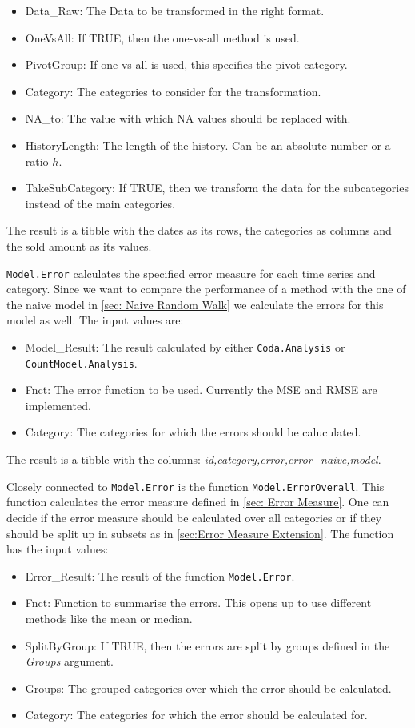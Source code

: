 \begin{itemize}
	\item Data\_Raw: The Data to be transformed in the right format.
  \item OneVsAll: If TRUE, then the one-vs-all method is used.
  \item PivotGroup: If one-vs-all is used, this specifies the pivot category.
  \item Category: The categories to consider for the transformation.
  \item NA\_to: The value with which NA values should be replaced with.
  \item HistoryLength: The length of the history. Can be an absolute number or a ratio $h$. 
  \item TakeSubCategory: If TRUE, then we transform the data for the subcategories instead of the main categories. 
\end{itemize}

The result is a tibble with the dates as its rows, the categories as columns and the sold amount as its values.

\texttt{Model.Error} calculates the specified error measure for each time series and category. Since we want to compare the performance of a method with the one of the naive model in \ref{sec: Naive Random Walk} we calculate the errors for this model as well. The input values are:

\begin{itemize}
	\item Model\_Result: The result calculated by either \texttt{Coda.Analysis} or \texttt{CountModel.Analysis}.
	\item Fnct: The error function to be used. Currently the MSE and RMSE are implemented. 
	\item Category: The categories for which the errors should be caluculated.
\end{itemize}

The result is a tibble with the columns: \textit{id,category,error,error\_naive,model}. 

Closely connected to \texttt{Model.Error} is the function \texttt{Model.ErrorOverall}. This function calculates the error measure defined in \ref{sec: Error Measure}. One can decide if the error measure should be calculated over all categories or if they should be split up in subsets as in \ref{sec:Error Measure Extension}. The function has the input values:

\begin{itemize}
	\item Error\_Result: The result of the function \texttt{Model.Error}.
	\item Fnct: Function to summarise the errors. This opens up to use different methods like the mean or median. 
	\item SplitByGroup: If TRUE, then the errors are split by groups defined in the \textit{Groups} argument. 
	\item Groups: The grouped categories over which the error should be calculated. 
	\item Category: The categories for which the error should be calculated for.
\end{itemize}

